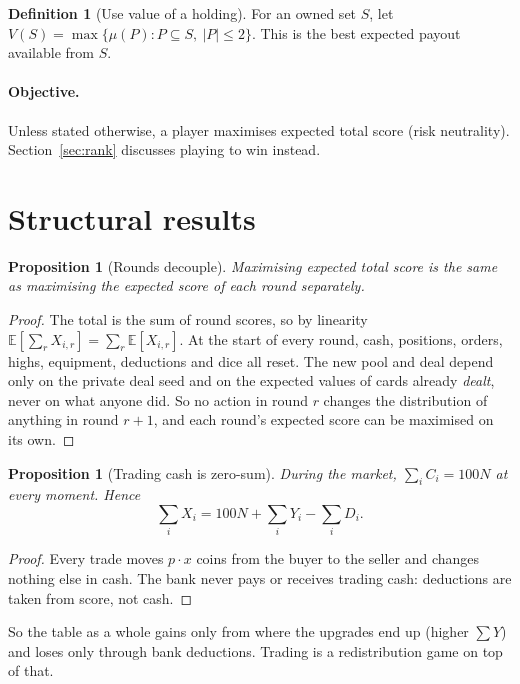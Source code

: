 \documentclass[11pt]{article}
\newtheorem{proposition}[theorem]{Proposition}
\theoremstyle{definition}
\newtheorem{definition}[theorem]{Definition}
\newcommand{\E}{\mathbb{E}}
\begin{document}
\begin{definition}[Use value of a holding]
For an owned set $S$, let $V(S) = \max\{\mu(P) : P \subseteq S,\ |P| \le 2\}$. This is the best expected payout available from $S$.
\end{definition}

\paragraph{Objective.} Unless stated otherwise, a player maximises expected total score (risk neutrality). Section~\ref{sec:rank} discusses playing to win instead.

\section{Structural results}

\begin{proposition}[Rounds decouple]\label{prop:decouple}
Maximising expected total score is the same as maximising the expected score of each round separately.
\end{proposition}
\begin{proof}
The total is the sum of round scores, so by linearity $\E[\sum_r X_{i,r}] = \sum_r \E[X_{i,r}]$. At the start of every round, cash, positions, orders, highs, equipment, deductions and dice all reset. The new pool and deal depend only on the private deal seed and on the expected values of cards already \emph{dealt}, never on what anyone did. So no action in round $r$ changes the distribution of anything in round $r+1$, and each round's expected score can be maximised on its own.
\end{proof}

\begin{proposition}[Trading cash is zero-sum]\label{prop:zerosum}
During the market, $\sum_i C_i = 100N$ at every moment. Hence
\[
  \sum_i X_i = 100N + \sum_i Y_i - \sum_i D_i .
\]
\end{proposition}
\begin{proof}
Every trade moves $p\cdot x$ coins from the buyer to the seller and changes nothing else in cash. The bank never pays or receives trading cash: deductions are taken from score, not cash.
\end{proof}

So the table as a whole gains only from where the upgrades end up (higher $\sum Y$) and loses only through bank deductions. Trading is a redistribution game on top of that.
\end{document}
